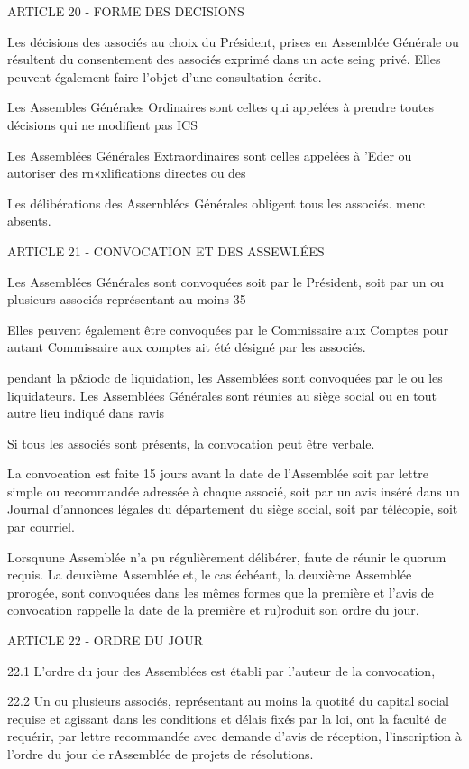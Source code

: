 \documentclass{article}
\begin{document}
ARTICLE 20 - FORME DES DECISIONS

Les décisions des associés au choix du Président, prises en Assemblée Générale ou résultent du consentement des associés exprimé dans un acte seing privé. Elles peuvent également faire l'objet d'une consultation écrite.

Les Assembles Générales Ordinaires sont celtes qui appelées à prendre toutes décisions qui ne modifient pas ICS

Les Assemblées Générales Extraordinaires sont celles appelées à 'Eder ou autoriser des rn«xlifications directes ou des

Les délibérations des Assernblécs Générales obligent tous les associés. menc absents.

ARTICLE 21 - CONVOCATION ET DES ASSEWLÉES

Les Assemblées Générales sont convoquées soit par le Président, soit par un ou plusieurs associés représentant au moins 35 %

Elles peuvent également être convoquées par le Commissaire aux Comptes pour autant Commissaire aux comptes ait été désigné par les associés.

pendant la p&iodc de liquidation, les Assemblées sont convoquées par le ou les liquidateurs. Les Assemblées Générales sont réunies au siège social ou en tout autre lieu indiqué dans ravis

Si tous les associés sont présents, la convocation peut être verbale.

La convocation est faite 15 jours avant la date de l'Assemblée soit par lettre simple ou recommandée adressée à chaque associé, soit par un avis inséré dans un Journal d'annonces légales du département du siège social, soit par télécopie, soit par courriel.

Lorsquune Assemblée n'a pu régulièrement délibérer, faute de réunir le quorum requis. La deuxième Assemblée et, le cas échéant, la deuxième Assemblée prorogée, sont convoquées dans les mêmes formes que la première et l'avis de convocation rappelle la date de la première et ru)roduit son ordre du jour.

ARTICLE 22 - ORDRE DU JOUR

22.1 L'ordre du jour des Assemblées est établi par l'auteur de la convocation,

22.2 Un ou plusieurs associés, représentant au moins la quotité du capital social requise et agissant dans les conditions et délais fixés par la loi, ont la faculté de requérir, par lettre recommandée avec demande d'avis de réception, l'inscription à l'ordre du jour de rAssemblée de projets de résolutions.
\end{document}
